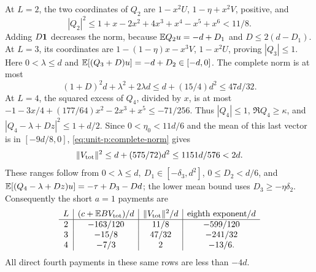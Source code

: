 At \(L=2\), the two coordinates of \(Q_2\) are
\(1-x^2U\), \(1-\eta+x^2V\), positive, and
\[
 |Q_2|^2\le
 1+x-2x^2+4x^3+x^4-x^5+x^6<11/8.
\]
Adding \(D\mathbf1\) decreases the norm, because
\(\mathbb E Q_2u=-d+D_1\) and \(D\le2(d-D_1)\).
At \(L=3\), its coordinates are
\(1-(1-\eta)x-x^3V\), \(1-x^2U\), proving \(|Q_3|\le1\).
Here \(0<\lambda\le d\) and
\(\mathbb E[(Q_3+D)u]=-d+D_2\in[-d,0]\). The complete norm is at most
\begin{equation}\label{eq:unit-p:data-14}
(1+D)^2d+\lambda^2+2\lambda d
 \le d+(15/4)d^2\le47d/32.
\end{equation}
At \(L=4\), the squared excess of \(Q_4\), divided by \(x\),
is at most
\(-1-3x/4+(177/64)x^2-2x^3+x^5\le-71/256\).
Thus \(|Q_4|\le1\), \(\Re Q_4\ge\kappa\), and
\(|Q_4-\lambda+Dz|^2\le1+d/2\).
Since \(0<\eta_0<11d/6\) and the mean of this last vector is
in \([-9d/8,0]\), \eqref{eq:unit-p:complete-norm} gives
\[
 \|V_{\rm tot}\|^2\le
 d+(575/72)d^2\le1151d/576<2d .
\]
These ranges follow from
\(0<\lambda\le d,\ D_1\in[-\delta_3,d^2]\),
\(0\le D_2<d/6\), and
\(\mathbb E[(Q_4-\lambda+Dz)u]=-\tau+D_3-Dd\);
the lower mean bound uses \(D_3\ge-\eta\delta_2\).
Consequently the short \(a=1\) payments are
\begin{equation}\label{eq:unit-p:data-15}
\begin{array}{c|c|c|c}
 L&(c+\mathbb E BV_{\rm tot})/d&\|V_{\rm tot}\|^2/d&
               \text{eighth exponent}/d\\\hline
 2&-163/120&11/8&-599/120\\
 3&-15/8&47/32&-241/32\\
 4&-7/3&2&-13/6 .
\end{array}
\end{equation}
All direct fourth payments in these same rows are less than
\(-4d\).

